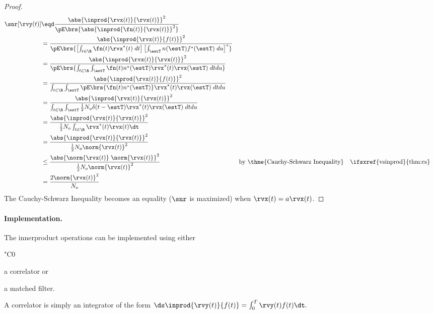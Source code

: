 \begin{proposition}
\begin{proof}
\begin{align*}
   \snr[\rvy(t)]
     &\eqd \frac{\abs{\inprod{\rvx(t)}{\rvx(t)}}^2}
                {\pE\brs{\abs{\inprod{\fn(t)}{\rvx(t)}}^2}}
   \\&=    \frac{\abs{\inprod{\rvx(t)}{f(t)}}^2}
                {\pE\brs{\left[\int_{t\in\R} \fn(t)\rvx^\ast(t)\;dt\right]
                      \left[\int_{\estT} n(\estT)f^\ast(\estT)\;du\right]^\ast}
                }
   \\&=    \frac{\abs{\inprod{\rvx(t)}{\rvx(t)}}^2}
                {\pE\brs{\int_{t\in\R} \int_{\estT} \fn(t)n^\ast(\estT)\rvx^\ast(t)\rvx(\estT)\;dtdu}}
   \\&=    \frac{\abs{\inprod{\rvx(t)}{f(t)}}^2}
                {\int_{t\in\R} \int_{\estT} \pE\brs{\fn(t)n^\ast(\estT)}\rvx^\ast(t)\rvx(\estT)\;dtdu}
   \\&=    \frac{\abs{\inprod{\rvx(t)}{\rvx(t)}}^2}
                {\int_{t\in\R} \int_{\estT} \frac{1}{2}N_o\delta(t-\estT) \rvx^\ast(t)\rvx(\estT)\;dtdu}
   \\&=    \frac{\abs{\inprod{\rvx(t)}{\rvx(t)}}^2}
                {\frac{1}{2}N_o \int_{t\in\R} \rvx^\ast(t)\rvx(t)\dt}
   \\&=    \frac{\abs{\inprod{\rvx(t)}{\rvx(t)}}^2}
                {\frac{1}{2}N_o \norm{\rvx(t)}^2}
   \\&\le  \frac{\abs{\norm{\rvx(t)}\;\norm{\rvx(t)}}^2}
                {\frac{1}{2}N_o \norm{\rvx(t)}^2}
     &&    \text{by \thme{Cauchy-Schwarz Inequality}}
     &&    \text{\ifsxref{vsinprod}{thm:cs}}
   \\&=    \frac{2\norm{\rvx(t)}^2}
                {N_o }
\end{align*}
The Cauchy-Schwarz Inequality becomes an equality
($\snr$ is maximized) when $\rvx(t)=a\rvx(t)$.
\end{proof}

\paragraph{Implementation.}
The innerproduct operations can be implemented using either
  \begin{dingautolist}{"C0}
     \item a correlator or
     \item a matched filter.
  \end{dingautolist}

A correlator is simply an integrator of the form
   $\ds\inprod{\rvy(t)}{f(t)} = \int_0^T \rvy(t)f(t)\dt.$


\end{proposition}
